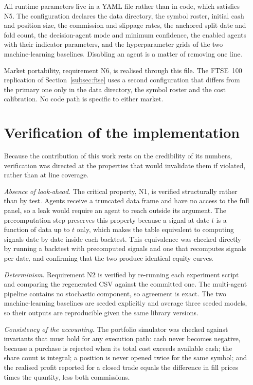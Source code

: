 All runtime parameters live in a YAML file rather than in code, which satisfies N5. The configuration declares the data directory, the symbol roster, initial cash and position size, the commission and slippage rates, the anchored split date and fold count, the decision-agent mode and minimum confidence, the enabled agents with their indicator parameters, and the hyperparameter grids of the two machine-learning baselines. Disabling an agent is a matter of removing one line.

Market portability, requirement N6, is realised through this file. The FTSE~100 replication of Section~\ref{subsec:ftse} uses a second configuration that differs from the primary one only in the data directory, the symbol roster and the cost calibration. No code path is specific to either market.

\section{Verification of the implementation}\label{sec:verification}

Because the contribution of this work rests on the credibility of its numbers, verification was directed at the properties that would invalidate them if violated, rather than at line coverage.

\emph{Absence of look-ahead.} The critical property, N1, is verified structurally rather than by test. Agents receive a truncated data frame and have no access to the full panel, so a leak would require an agent to reach outside its argument. The precomputation step preserves this property because a signal at date $t$ is a function of data up to $t$ only, which makes the table equivalent to computing signals date by date inside each backtest. This equivalence was checked directly by running a backtest with precomputed signals and one that recomputes signals per date, and confirming that the two produce identical equity curves.

\emph{Determinism.} Requirement N2 is verified by re-running each experiment script and comparing the regenerated CSV against the committed one. The multi-agent pipeline contains no stochastic component, so agreement is exact. The two machine-learning baselines are seeded explicitly and average three seeded models, so their outputs are reproducible given the same library versions.

\emph{Consistency of the accounting.} The portfolio simulator was checked against invariants that must hold for any execution path: cash never becomes negative, because a purchase is rejected when its total cost exceeds available cash; the share count is integral; a position is never opened twice for the same symbol; and the realised profit reported for a closed trade equals the difference in fill prices times the quantity, less both commissions.

